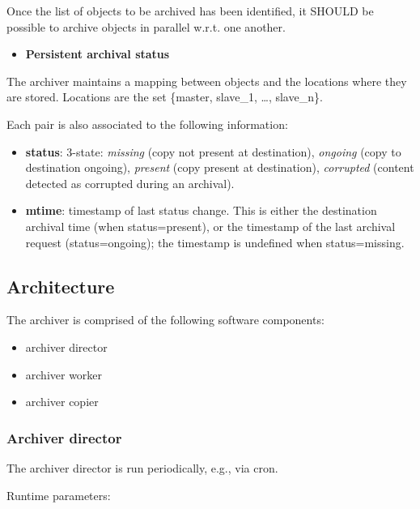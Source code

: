 Once the list of objects to be archived has been identified, it SHOULD
be possible to archive objects in parallel w.r.t. one another.

\begin{itemize}
\itemsep1pt\parskip0pt
\item
  \textbf{Persistent archival status}
\end{itemize}

The archiver maintains a mapping between objects and the locations where
they are stored. Locations are the set \{master, slave\_1, \ldots{},
slave\_n\}.

Each pair is also associated to the following information:

\begin{itemize}
\itemsep1pt\parskip0pt
\item
  \textbf{status}: 3-state: \emph{missing} (copy not present at
  destination), \emph{ongoing} (copy to destination ongoing),
  \emph{present} (copy present at destination), \emph{corrupted}
  (content detected as corrupted during an archival).
\item
  \textbf{mtime}: timestamp of last status change. This is either the
  destination archival time (when status=present), or the timestamp of
  the last archival request (status=ongoing); the timestamp is undefined
  when status=missing.
\end{itemize}

\subsection{Architecture}\label{architecture-1}

The archiver is comprised of the following software components:

\begin{itemize}
\itemsep1pt\parskip0pt
\item
  archiver director
\item
  archiver worker
\item
  archiver copier
\end{itemize}

\subsubsection{Archiver director}\label{archiver-director-1}

The archiver director is run periodically, e.g., via cron.

Runtime parameters:

